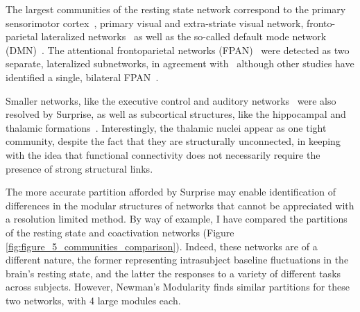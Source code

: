 

The largest communities of the resting state network correspond to the primary sensorimotor cortex~\cite{biswal1995}, primary visual and extra-striate visual network, fronto-parietal lateralized networks~\cite{smith2009} as well as the so-called default mode network (DMN)~\cite{raichle2001,fransson2006}.
The attentional frontoparietal networks (FPAN)~\cite{beckmann2005} were detected as two separate, lateralized subnetworks, in agreement with~\cite{deluca2006} although other studies have identified a single, bilateral FPAN~\cite{markett2014}.

Smaller networks, like the executive control and auditory networks~\cite{salvador2005,vandenheuvel2010} were also resolved by Surprise, as well as subcortical structures, like the hippocampal and thalamic formations~\cite{roy2009,chen2013}. Interestingly, the thalamic nuclei appear as one tight community, despite the fact that they are structurally unconnected, in keeping with the idea that functional connectivity does not necessarily require the presence of strong structural links.

The more accurate partition afforded by Surprise may enable identification of differences in the modular structures of networks that cannot be appreciated with a resolution limited method. By way of example, I have compared the partitions of the resting state and coactivation networks (Figure \ref{fig:figure_5_communities_comparison}). Indeed, these networks are of a different nature, the former representing intrasubject baseline fluctuations in the brain's resting state, and the latter the responses to a variety of different tasks across subjects. However, Newman's Modularity finds similar partitions for these two networks, with 4 large modules each.

